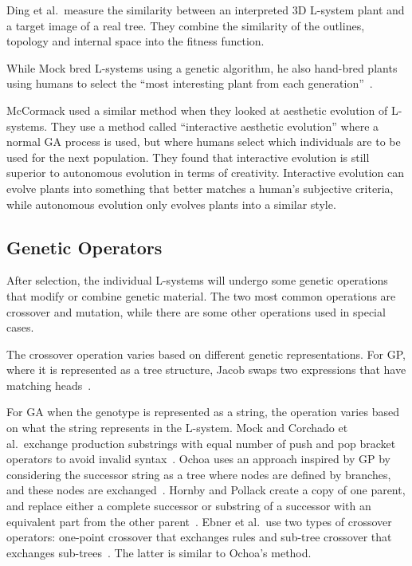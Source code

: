Ding et al.\ measure the similarity between an interpreted 3D \gls{L-system} plant and a target image of a real tree.
They combine the similarity of the outlines, topology and internal space into the fitness function.~\cite{2013Ding}

While Mock bred \glspl{L-system} using a genetic algorithm, he also hand-bred plants using humans to select the ``most interesting plant from each generation''~\cite{1998Mock}.

McCormack used a similar method when they looked at aesthetic evolution of \glspl{L-system}.
They use a method called ``interactive aesthetic evolution'' where a normal \gls{GA} process is used, but where humans select which individuals are to be used for the next population.
They found that interactive evolution is still superior to autonomous evolution in terms of creativity.
Interactive evolution can evolve plants into something that better matches a human's subjective criteria, while autonomous evolution only evolves plants into a similar style.~\cite{2004McCormack}

\subsection{Genetic Operators}
After selection, the individual \glspl{L-system} will undergo some genetic operations that modify or combine genetic material.
The two most common operations are crossover and mutation, while there are some other operations used in special cases.

The crossover operation varies based on different genetic representations.
For \gls{GP}, where it is represented as a tree structure, Jacob swaps two expressions that have matching heads~\cite{1994Jacob,1995Jacob}.

For \gls{GA} when the genotype is represented as a string, the operation varies based on what the string represents in the \gls{L-system}.
Mock and Corchado et al.\ exchange production substrings with equal number of push and pop bracket operators to avoid invalid syntax~\cite{1998Mock,2009Corchado}.
Ochoa uses an approach inspired by \gls{GP} by considering the successor string as a tree where nodes are defined by branches, and these nodes are exchanged~\cite{1998Ochoa}.
Hornby and Pollack create a copy of one parent, and replace either a complete successor or substring of a successor with an equivalent part from the other parent~\cite{2001Hornby}.
Ebner et al.\ use two types of crossover operators: one-point crossover that exchanges rules and sub-tree crossover that exchanges sub-trees~\cite{2002Ebner,2003Ebner}.
The latter is similar to Ochoa's method.

